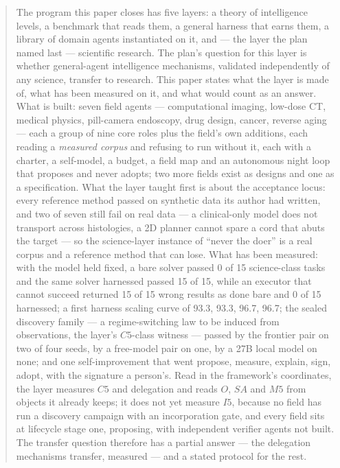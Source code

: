 \begin{abstract}
The program this paper closes has five layers: a theory of intelligence levels, a benchmark that reads them, a general harness that earns them, a library of domain agents instantiated on it, and --- the layer the plan named last --- scientific research. The plan's question for this layer is whether general-agent intelligence mechanisms, validated independently of any science, transfer to research. This paper states what the layer is made of, what has been measured on it, and what would count as an answer. What is built: seven field agents --- computational imaging, low-dose CT, medical physics, pill-camera endoscopy, drug design, cancer, reverse aging --- each a group of nine core roles plus the field's own additions, each reading a \emph{measured corpus} and refusing to run without it, each with a charter, a self-model, a budget, a field map and an autonomous night loop that proposes and never adopts; two more fields exist as designs and one as a specification. What the layer taught first is about the acceptance locus: every reference method passed on synthetic data its author had written, and two of seven still fail on real data --- a clinical-only model does not transport across histologies, a 2D planner cannot spare a cord that abuts the target --- so the science-layer instance of ``never the doer'' is a real corpus and a reference method that can lose. What has been measured: with the model held fixed, a bare solver passed 0 of 15 science-class tasks and the same solver harnessed passed 15 of 15, while an executor that cannot succeed returned 15 of 15 wrong results as done bare and 0 of 15 harnessed; a first harness scaling curve of 93.3, 93.3, 96.7, 96.7; the sealed discovery family --- a regime-switching law to be induced from observations, the layer's $C5$-class witness --- passed by the frontier pair on two of four seeds, by a free-model pair on one, by a 27B local model on none; and one self-improvement that went propose, measure, explain, sign, adopt, with the signature a person's. Read in the framework's coordinates, the layer measures $C5$ and delegation and reads $O$, $SA$ and $M5$ from objects it already keeps; it does not yet measure $I5$, because no field has run a discovery campaign with an incorporation gate, and every field sits at lifecycle stage one, proposing, with independent verifier agents not built. The transfer question therefore has a partial answer --- the delegation mechanisms transfer, measured --- and a stated protocol for the rest.
\end{abstract}

